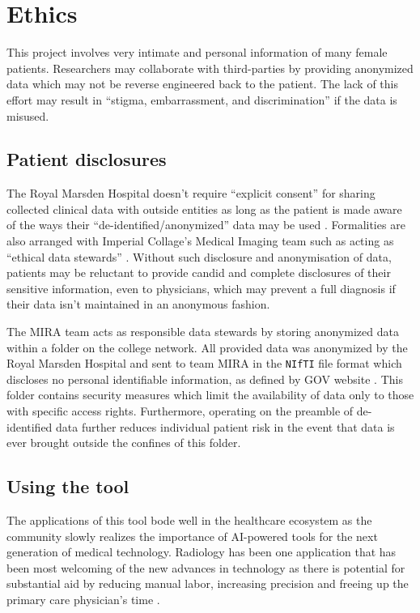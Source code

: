 \documentclass[11pt,twoside]{report}
\begin{document}
\chapter{Ethics}\label{sect:ethics}

This project involves very intimate and personal information of many female patients. Researchers may collaborate with third-parties by providing anonymized data which may not be reverse engineered back to the patient.
The lack of this effort may result in ``stigma, embarrassment, and discrimination'' \cite{health-privacy} if the data is misused.

\section{Patient disclosures}\label{sect:patient-disclosures}

The Royal Marsden Hospital doesn't require ``explicit consent'' for sharing collected clinical data with outside entities as long as the patient is made aware of the ways their ``de-identified/anonymized'' data may be used  \cite{royal-marsden-privacy-note}. Formalities are also arranged with Imperial Collage's Medical Imaging team such as acting as ``ethical data stewards'' \cite{ethics-imaging-AI}. Without such disclosure and anonymisation of data, patients may be reluctant to provide candid and complete disclosures of their sensitive information, even to physicians, which may prevent a full diagnosis if their data isn't maintained in an anonymous fashion.

The MIRA team acts as responsible data stewards by storing anonymized data within a folder on the college network. All provided data was anonymized by the Royal Marsden Hospital and sent to team MIRA in the \texttt{NIfTI} file format which discloses no personal identifiable information, as defined by GOV website \cite{gov-gdpr}. This folder contains security measures which limit the availability of data only to those with specific access rights. Furthermore, operating on the preamble of de-identified data further reduces individual patient risk in the event that data is ever brought outside the confines of this folder.

\section{Using the tool}\label{sect:using-the-tool}

The applications of this tool bode well in the healthcare ecosystem as the community slowly realizes the importance of AI-powered tools for the next generation of medical technology. Radiology has been one application that has been most welcoming of the new advances in technology as there is potential for substantial aid by reducing manual labor, increasing precision and freeing up the primary care physician's time \cite{overview-of-ai-medicine}.
\end{document}
